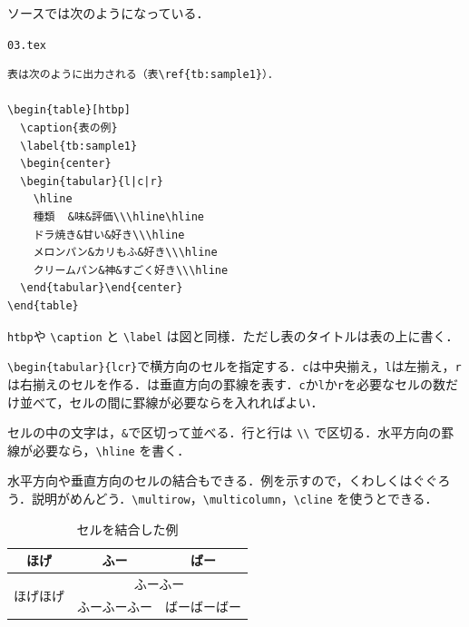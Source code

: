 ソースでは次のようになっている．

\begin{itembox}[l]{{\tt 03.tex}}
\begin{verbatim}
表は次のように出力される（表\ref{tb:sample1}）．

\begin{table}[htbp]
  \caption{表の例}
  \label{tb:sample1}
  \begin{center}
  \begin{tabular}{l|c|r}
    \hline
    種類	&味&評価\\\hline\hline
    ドラ焼き&甘い&好き\\\hline
    メロンパン&カリもふ&好き\\\hline
    クリームパン&神&すごく好き\\\hline
  \end{tabular}\end{center}
\end{table}
\end{verbatim}
\end{itembox}

{\tt htbp}や \verb|\caption| と \verb|\label| は図と同様．ただし表のタイトルは表の上に書く．

\verb|\begin{tabular}{l|{\tt \textbar}{\tt c}{\tt \textbar}\verb|r}|で横方向のセルを指定する．{\tt c}は中央揃え，{\tt l}は左揃え，{\tt r}は右揃えのセルを作る．{\tt \textbar}は垂直方向の罫線を表す．{\tt c}か{\tt l}か{\tt r}を必要なセルの数だけ並べて，セルの間に罫線が必要なら{\tt \textbar}を入れればよい．

セルの中の文字は，{\tt \&}で区切って並べる．行と行は \verb|\\| で区切る．水平方向の罫線が必要なら，\verb|\hline| を書く．

水平方向や垂直方向のセルの結合もできる．例を示すので，くわしくはぐぐろう．説明がめんどう．\verb|\multirow|，\verb|\multicolumn|，\verb|\cline| を使うとできる．

\begin{table}[htbp]
  \caption{セルを結合した例}
  \label{tb:sample2}
  \begin{center}
  \begin{tabular}{c|c|c}
    \hline
    ほげ&ふー&ばー\\\hline\hline
    \multirow{2}{*}{ほげほげ}&\multicolumn{2}{c}{ふーふー} \\\cline{2-3}
    &ふーふーふー&ばーばーばー\\\hline
  \end{tabular}
  \end{center}
\end{table}

